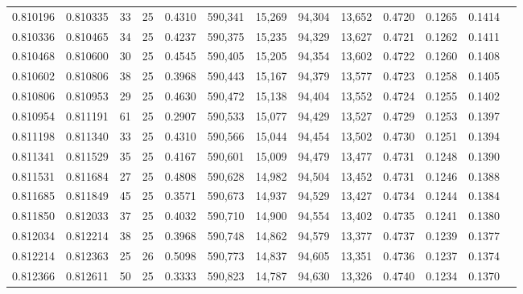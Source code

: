 \begin{tabular}{rrrrrrrrrrrrr}
0.810196 & 0.810335 &    33 &  25 &                                     0.4310 & 590,341 &  15,269 &  94,304 &  13,652 & 0.4720 & 0.1265 & 0.1414 \\
0.810336 & 0.810465 &    34 &  25 &                                     0.4237 & 590,375 &  15,235 &  94,329 &  13,627 & 0.4721 & 0.1262 & 0.1411 \\
0.810468 & 0.810600 &    30 &  25 &                                     0.4545 & 590,405 &  15,205 &  94,354 &  13,602 & 0.4722 & 0.1260 & 0.1408 \\
0.810602 & 0.810806 &    38 &  25 &                                     0.3968 & 590,443 &  15,167 &  94,379 &  13,577 & 0.4723 & 0.1258 & 0.1405 \\
0.810806 & 0.810953 &    29 &  25 &                                     0.4630 & 590,472 &  15,138 &  94,404 &  13,552 & 0.4724 & 0.1255 & 0.1402 \\
0.810954 & 0.811191 &    61 &  25 &                                     0.2907 & 590,533 &  15,077 &  94,429 &  13,527 & 0.4729 & 0.1253 & 0.1397 \\
0.811198 & 0.811340 &    33 &  25 &                                     0.4310 & 590,566 &  15,044 &  94,454 &  13,502 & 0.4730 & 0.1251 & 0.1394 \\
0.811341 & 0.811529 &    35 &  25 &                                     0.4167 & 590,601 &  15,009 &  94,479 &  13,477 & 0.4731 & 0.1248 & 0.1390 \\
0.811531 & 0.811684 &    27 &  25 &                                     0.4808 & 590,628 &  14,982 &  94,504 &  13,452 & 0.4731 & 0.1246 & 0.1388 \\
0.811685 & 0.811849 &    45 &  25 &                                     0.3571 & 590,673 &  14,937 &  94,529 &  13,427 & 0.4734 & 0.1244 & 0.1384 \\
0.811850 & 0.812033 &    37 &  25 &                                     0.4032 & 590,710 &  14,900 &  94,554 &  13,402 & 0.4735 & 0.1241 & 0.1380 \\
0.812034 & 0.812214 &    38 &  25 &                                     0.3968 & 590,748 &  14,862 &  94,579 &  13,377 & 0.4737 & 0.1239 & 0.1377 \\
0.812214 & 0.812363 &    25 &  26 &                                     0.5098 & 590,773 &  14,837 &  94,605 &  13,351 & 0.4736 & 0.1237 & 0.1374 \\
0.812366 & 0.812611 &    50 &  25 &                                     0.3333 & 590,823 &  14,787 &  94,630 &  13,326 & 0.4740 & 0.1234 & 0.1370 \\

\end{tabular}
